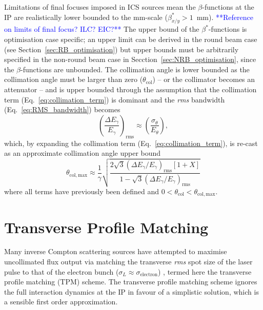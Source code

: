 \documentclass[../main.tex]{subfiles}
\begin{document}
Limitations of final focuses imposed in ICS sources mean the $\beta$-functions at the IP are realistically lower bounded to the \si{\milli\meter}-scale ($\beta_{x/y}^{*} > 1$~\si{\milli\meter}). \textcolor{blue}{**Reference on limits of final focus? ILC? EIC?**} The upper bound of the $\beta^{*}$-functions is optimisation case specific; an upper limit can be derived in the round beam case (see Section~\ref{sec:RB_optimisation}) but upper bounds must be arbitrarily specified in the non-round beam case in Secction~\ref{sec:NRB_optimisation}, since the $\beta$-functions are unbounded. The collimation angle is lower bounded as the collimation angle must be larger than zero ($\theta_{\mathrm{col}}$) -- or the collimator becomes an attenuator -- and is upper bounded through the assumption that the collimation term (Eq.~\ref{eq:collimation_term}) is dominant and the \textit{rms} bandwidth (Eq.~\ref{eq:RMS_bandwidth}) becomes
\begin{equation}
\left(\frac{\Delta E_{\gamma}}{E_{\gamma}}\right)_{\mathrm{rms}} \approx \left(\frac{\sigma_{\theta}}{E_{\theta}}\right),    
\label{eq:collimation_dominant}
\end{equation}
which, by expanding the collimation term (Eq.~\ref{eq:collimation_term}), is re-cast as an approximate collimation angle upper bound  
\begin{equation}
\theta_{\mathrm{col},\mathrm{max}} \approx \frac{1}{\gamma}\sqrt{\frac{2\sqrt{3}\left(\Delta E_{\gamma}/E_{\gamma}\right)_{\mathrm{rms}}\left[1+X\right]}{1-\sqrt{3}\left(\Delta E_{\gamma}/E_{\gamma}\right)_{\mathrm{rms}}}}
\label{eq:collimation_angle_upper_bound}    
\end{equation}
where all terms have previously been defined and $0<\theta_{\mathrm{col}}<\theta_{\mathrm{col},\mathrm{max}}$.

\section{Transverse Profile Matching}
\label{sec:transverse_profile_matching}

Many inverse Compton scattering sources have attempted to maximise uncollimated flux output via matching the transverse \textit{rms} spot size of the laser pulse to that of the electron bunch ($\sigma_{L}\approx\sigma_{\mathrm{electron}}$) \cite{akagi2016narrow,deitrick2018high,jacquet2015radiation,drebot2019brixs}, termed here the transverse profile matching (TPM) scheme. The transverse profile matching scheme ignores the full interaction dynamics at the IP in favour of a simplistic solution, which is a sensible first order approximation. 
\end{document}
